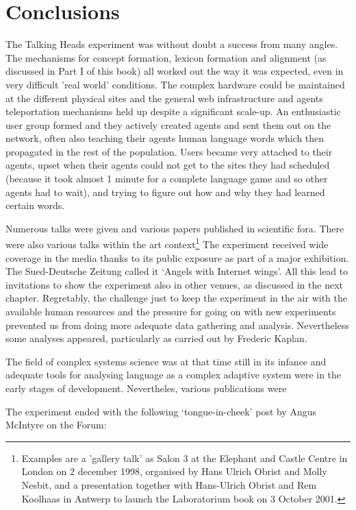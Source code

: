 \section{Conclusions} 

The Talking Heads experiment was without doubt a success from many angles. The mechanisms for concept formation,
lexicon formation and alignment (as discussed in Part I of this book) all worked out the 
way it was expected, even in very difficult 'real world' conditions. The complex hardware could be maintained at the 
different physical sites and the general web infrastructure and agents teleportation mechanisms held up despite a 
significant scale-up. An enthusiastic user group formed and they actively created agents and sent 
them out on the network, often also teaching their agents human language words which then propagated
in the rest of the population. Users became very attached to their agents, upset when their agents could not get 
to the sites they had scheduled (because it took almost 1 minute for a complete language game and so other agents 
had to wait), and trying to figure out how and why they had learned certain words. 

Numerous talks were given and various papers published in scientific fora. There were also various talks within 
the art context\footnote{Examples are a 'gallery talk' as Salon 3 at the Elephant and Castle Centre
in London on 2 december 1998, organised by Hans Ulrich Obrist and Molly Nesbit, and a presentation together with 
Hans-Ulrich Obrist and Rem Koolhaas in Antwerp to launch the Laboratorium book on 3 October 2001.}
The experiment received wide coverage in 
the media thanks to its public exposure as part of a major exhibition. The Sued-Deutsche Zeitung called it 
`Angels with Internet wings'. All this lead to invitations to show the experiment
also in other venues, as discussed in the next chapter. 
Regretably, the challenge just to keep the experiment in the air with the available human resources
and the pressure for going on with new experiments prevented us from doing more adequate data gathering 
and analysis. Nevertheless some analyses appeared, particularly as carried out by Frederic Kaplan\cite{Kaplan:2001}. 

The field of complex systems science was at that time still in its infance and 
adequate tools for analysing language as a complex adaptive system were in the early stages of development. 
Nevertheles, various publications were 

The experiment ended with the following `tongue-in-cheek' post by Angus McIntyre on the Forum: \\

